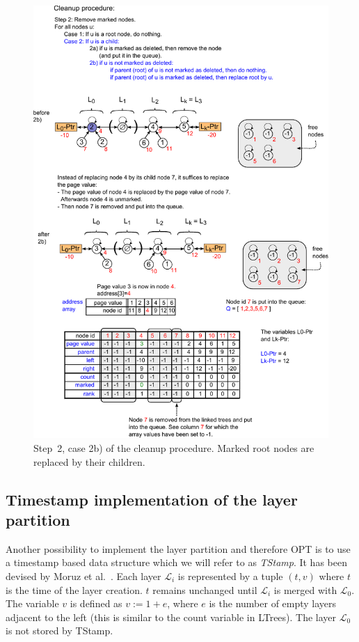 \documentclass[a4paper,12pt, titlepage]{article}  %
\newcommand{\cl}{\mathcal{L}}   %
\begin{document}
\begin{figure}[htp]
	\centering
	\includegraphics[scale=0.95]{./figures/java_implementation6.pdf}
	\caption{Step~2, case 2b) of the cleanup procedure. Marked root nodes are replaced by their children.} 
	\label{fig:java_implementation6}
\end{figure}


\subsection{Timestamp implementation of the layer partition}
Another possibility to implement the layer partition and therefore OPT is to use a timestamp based data structure
which we will refer to as \emph{TStamp}. It has been devised by Moruz et al.~\cite{sea12_paper}. 
Each layer $\cl_i$ is represented by a tuple $(t,v)$ where $t$ is the time of the 
layer creation. $t$ remains unchanged until $\cl_i$ is merged with $\cl_0$. The variable $v$ is defined as $v:=1+e$, where
$e$ is the number of empty layers adjacent to the left (this is similar to the count variable in LTrees). 
The layer $\cl_0$ is not stored by TStamp. 
\end{document}
